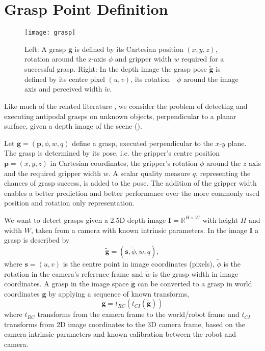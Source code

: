 \documentclass[conference]{IEEEtran}
\newcommand{\bbR}{\mathbb{R}}
\newcommand{\bg}{\mathbf{g}}
\newcommand{\bgt}{\tilde{\mathbf{g}}}
\newcommand{\bp}{\mathbf{p}}
\newcommand{\bs}{\mathbf{s}}
\newcommand{\by}{\mathbf{I}}
\begin{document}
\section{Grasp Point Definition}

\begin{figure}[tpb]
    \centering
    \texttt{[image: grasp]}
    \vspace{-6mm}
    \caption{Left: A grasp $\bg$ is defined by its Cartesian position $(x,y,z)$, rotation around the z-axis $\phi$ and gripper width $w$ required for a successful grasp.  Right: In the depth image the grasp pose $\tilde{\bg}$ is defined by its centre pixel $(u, v)$, its rotation\ \ $\tilde{\phi}$ around the image axis and perceived width $\tilde{w}$. 
    }
  \label{fig:problemdefinition} 
  \vspace{-6mm}
\end{figure}

Like much of the related literature \cite{Johns2016DeepUncertainty, Lenz2015DeepGrasps, Mahler2017Dex2, Pinto2016SupersizingHours, Viereck2017LearningImages}, we consider the problem of detecting and executing antipodal grasps on unknown objects, perpendicular to a planar surface, given a depth image of the scene ().

Let $\bg = (\bp, \phi, w, q)$ define a grasp, executed perpendicular to the $x$-$y$ plane. 
The grasp is determined by its pose, i.e. the gripper's centre position $\bp = (x, y, z)$ in Cartesian coordinates, the gripper's rotation $\phi$ around the $z$ axis and the required gripper width $w$. 
A scalar quality measure $q$, representing the chances of grasp success, is added to the pose. 
The addition of the gripper width enables a better prediction and better performance over the more commonly used position and rotation only representation. 

We want to detect grasps given a 2.5D depth image $\by = \bbR^{H \times W}$ with height $H$ and width $W$, taken from a camera with known intrinsic parameters.  In the image $\by$ a grasp is described by  \begin{equation*}
\bgt = (\bs, \tilde{\phi}, \tilde{w}, q),
\end{equation*}
where $\bs = (u, v)$ is the centre point in image coordinates (pixels), $\tilde{\phi}$ is the rotation in the camera's reference frame and $\tilde{w}$ is the grasp width in image coordinates.  A grasp in the image space $\bgt$ can be converted to a grasp in world coordinates $\bg$ by applying a sequence of known transforms,
\begin{equation}\label{eq:transform}
    \bg = t_{RC} ( t_{CI} ( \bgt ))
\end{equation}
where $t_{RC}$  transforms from the camera frame to the world/robot frame and $t_{CI}$ transforms from 2D image coordinates to the 3D camera frame, based on the camera intrinsic parameters and known calibration between the robot and camera. 
\end{document}
